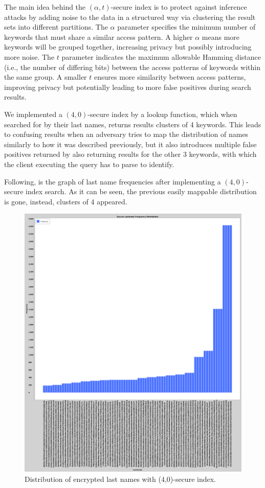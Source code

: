 The main idea behind the $(\alpha,t)$-secure index is to protect against inference attacks by adding noise to the data in a structured way via clustering the result sets into different partitions. The $\alpha$ parameter specifies the minimum number of keywords that must share a similar access pattern. A higher $\alpha$ means more keywords will be grouped together, increasing privacy but possibly introducing more noise. The $t$ parameter indicates the maximum allowable Hamming distance (i.e., the number of differing bits) between the access patterns of keywords within the same group. A smaller $t$ ensures more similarity between access patterns, improving privacy but potentially leading to more false positives during search results.

We implemented a $(4,0)$-secure index by a lookup function, which when searched for by their last names, returns results clusters of 4 keywords. This leads to confusing results when an adversary tries to map the distribution of names similarly to how it was described previously, but it also introduces multiple false positives returned by also returning results for the other 3 keywords, with which the client executing the query has to parse to identify.

Following, is the graph of last name frequencies after implementing a $(4, 0)$-secure index search. As it can be seen, the previous easily mappable distribution is gone, instead, clusters of 4 appeared.

\begin{figure}[H]
    \centering
    \includegraphics[width=\textwidth]{03-ex2/Secure_Lastname_Frequency_Distribution.png}
    \caption{Distribution of encrypted last names with (4,0)-secure index.}
    \label{fig:Distribution-of-last-names-sec}
\end{figure}

